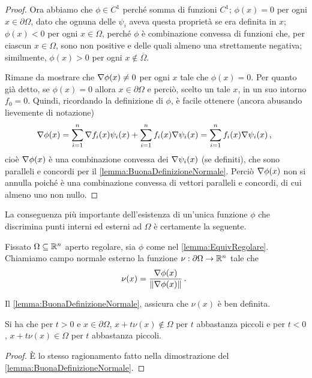 \begin{proof}
	Ora abbiamo che $\phi\in C^1$ perché somma di funzioni $C^1$; $\phi(x)=0$ per ogni $x\in \partial\Omega$, dato che ognuna delle
	$\psi_i$ aveva questa proprietà se era definita in $x$;
	$\phi(x)<0$ per ogni $x \in \Omega$, perché $\phi$ è combinazione convessa di funzioni che, per ciascun $x\in\Omega$, sono non positive e
	delle quali almeno una strettamente negativa; similmente, $\phi(x)>0$ per ogni $x \notin \overline\Omega$.
	
	Rimane da mostrare che $\nabla \phi(x)\neq 0$ per ogni $x$ tale che $\phi(x)=0$. 
	Per quanto già detto, se $\phi(x)=0$ allora $x\in\partial\Omega$ e perciò, scelto un tale $x$, in un suo intorno $f_0=0$. 
	Quindi, ricordando la definizione di $\phi$, è facile ottenere (ancora abusando lievemente di notazione)
	\begin{equation*}
		\nabla\phi(x)=\sum_{i=1}^n\nabla f_i(x)\psi_i(x)+\sum_{i=1}^n f_i(x)\nabla\psi_i(x)=\sum_{i=1}^n f_i(x)\nabla\psi_i(x)\, \text{, }
	\end{equation*}
	cioè $\nabla\phi(x)$ è una combinazione convessa dei $\nabla\psi_i(x)$ (se definiti), che sono paralleli e concordi per il \cref{lemma:BuonaDefinizioneNormale}. 
	Perciò $\nabla\phi(x)$ non si annulla poiché è una combinazione convessa di vettori paralleli e concordi, di cui almeno uno non nullo.
\end{proof}

La conseguenza più importante dell'esistenza di un'unica funzione $\phi$ che discrimina punti interni ed esterni ad $\Omega$ è certamente la seguente.

\begin{definition}
	Fissato $\Omega\subseteq\mathbb R^n$ aperto regolare, sia $\phi$ come nel \cref{lemma:EquivRegolare}. Chiamiamo campo normale esterno la funzione $\nu:\partial\Omega\rightarrow \mathbb R^n$ tale che
	\[
		\nu(x)=\frac{\nabla \phi(x)}{\lVert\nabla \phi(x)\rVert}\, \text{. }
	\]
\end{definition}
\begin{remark}
	Il \cref{lemma:BuonaDefinizioneNormale}, assicura che $\nu(x)$ è ben definita.
\end{remark}

\begin{remark}
	Si ha che per $t>0$ e $x\in\partial\Omega$, $x+t\nu(x)\notin \Omega$ per $t$ abbastanza piccoli e per $t<0$, $x+t\nu(x)\in \Omega$ per $t$
	abbastanza piccoli.
\end{remark}
\begin{proof}
	È lo stesso ragionamento fatto nella dimostrazione del \cref{lemma:BuonaDefinizioneNormale}.
\end{proof}

